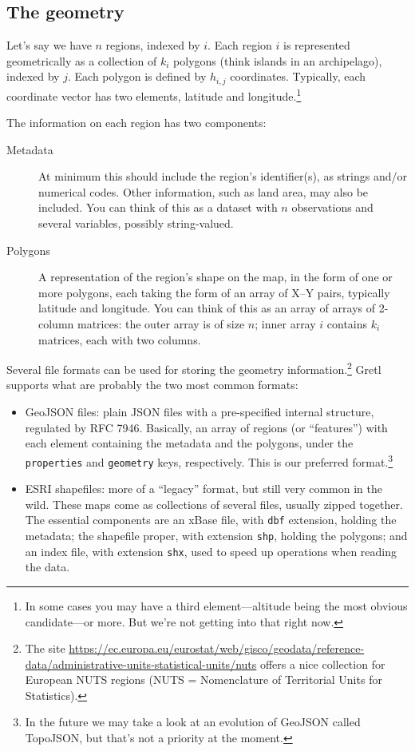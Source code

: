 \documentclass{article}
\begin{document}
\subsection{The geometry}
\label{sec:geometry}

Let's say we have $n$ regions, indexed by $i$. Each region $i$ is
represented geometrically as a collection of $k_i$ polygons (think
islands in an archipelago), indexed by $j$. Each polygon is defined by
$h_{i,j}$ coordinates. Typically, each coordinate vector has two
elements, latitude and longitude.\footnote{In some cases you may have
  a third element---altitude being the most obvious candidate---or
  more.  But we're not getting into that right now.}

The information on each region has two components:
\begin{description}
\item[Metadata] At minimum this should include the region's
  identifier(s), as strings and/or numerical codes. Other information,
  such as land area, may also be included. You can think of this as a
  dataset with $n$ observations and several variables, possibly
  string-valued.
\item[Polygons] A representation of the region's shape on the map, in
  the form of one or more polygons, each taking the form of an array
  of X--Y pairs, typically latitude and longitude. You can think of
  this as an array of arrays of 2-column matrices: the outer array is
  of size $n$; inner array $i$ contains $k_i$ matrices, each with two
  columns.
\end{description}

Several file formats can be used for storing the geometry
information.\footnote{The site
\url{https://ec.europa.eu/eurostat/web/gisco/geodata/reference-data/administrative-units-statistical-units/nuts}
offers a nice collection for European NUTS regions (NUTS =
Nomenclature of Territorial Units for Statistics).}
Gretl supports what are probably the two most common formats:
\begin{itemize}
\item GeoJSON files: plain JSON files with a pre-specified internal
  structure, regulated by RFC 7946. Basically, an array of regions (or
  ``features'') with each element containing the metadata and the
  polygons, under the \texttt{properties} and \texttt{geometry} keys,
  respectively.  This is our preferred format.\footnote{In the future
    we may take a look at an evolution of GeoJSON called TopoJSON, but
    that's not a priority at the moment.}
\item ESRI shapefiles: more of a ``legacy'' format, but still very
  common in the wild. These maps come as collections of several files,
  usually zipped together. The essential components are an
  \textsf{xBase} file, with \texttt{dbf} extension, holding the
  metadata; the shapefile proper, with extension \texttt{shp}, holding
  the polygons; and an index file, with extension \texttt{shx}, used
  to speed up operations when reading the data.
\end{itemize}
\end{document}
